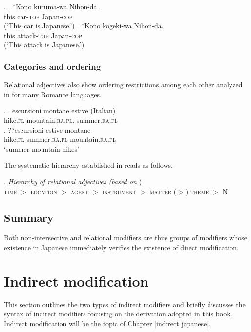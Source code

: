 \ex. \ag. *Kono kuruma-wa Nihon-da. \label{nihon}\\
this car-\textsc{top} Japan-\textsc{cop}\\
(`This car is Japanese.’)
\bg. *Kono kōgeki-wa Nihon-da.\\
this attack-\textsc{top} Japan-\textsc{cop}\\
(`This attack is Japanese.’)

\subsubsection{Categories and ordering} \label{ordering relational}

Relational adjectives also show ordering restrictions among each other analyzed in \citet{bortolotto:2016:RA} for many Romance languages. 

\ex. \ag. escursioni montane estive (Italian)\\
hike.\textsc{pl} mountain.\textsc{ra.pl}. summer.\textsc{ra.pl}\\
\bg. ??escursioni estive montane\\
hike.\textsc{pl} summer.\textsc{ra.pl} mountain.\textsc{ra.pl}\\
`summer mountain hikes’ \null\hfill \citep[148]{bortolotto:2016:RA}

The systematic hierarchy established in \citet{bortolotto:2016:RA} reads as follows.

\ex. \emph{Hierarchy of relational adjectives (based on \citealt[180]{bortolotto:2016:RA}})\\
\textsc{time} $>$ \textsc{location} $>$ \textsc{agent} $>$ \textsc{instrument} $>$ \textsc{matter} ($>$) \textsc{theme} $>$ N

\subsection{Summary}

Both non-intersective and relational modifiers are thus groups of modifiers whose existence in Japanese immediately verifies the existence of direct modification.

\section{Indirect modification} \label{dP}

This section outlines the two types of indirect modifiers and briefly discusses the syntax of indirect modifiers focusing on the derivation adopted in this book. Indirect modification will be the topic of Chapter \ref{indirect japanese}.

